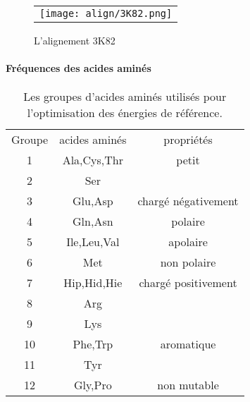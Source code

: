     \clearpage

   \begin{figure}[t]
     \centering
     \begin{tabular}{c}
       \texttt{[image: align/3K82.png]} \\
     \end{tabular}
     \caption{L'alignement 3K82 }
\label{graph:convEref}
   \end{figure}

    \clearpage




\paragraph{Fréquences des acides aminés}


    \begin{table}[!htbp]
      \centering

      \begin{tabular}{ccc}

        \toprule
        Groupe & acides aminés & propriétés\\
        \cmidrule{1-3}

        1   & Ala,Cys,Thr & petit\\
        2   & Ser &\\
        \cmidrule{1-3}
        3   & Glu,Asp & chargé négativement\\
        \cmidrule{1-3}
        4   & Gln,Asn & polaire\\
        \cmidrule{1-3}
        5   & Ile,Leu,Val & apolaire\\
        \cmidrule{1-3}
        6   & Met & non polaire\\
        \cmidrule{1-3}
        7   & Hip,Hid,Hie & chargé positivement\\
        8   & Arg \\
        9   & Lys \\
        \cmidrule{1-3}
        10  & Phe,Trp & aromatique\\
        11  & Tyr \\
        \cmidrule{1-3}
        12  & Gly,Pro & non mutable\\
        \bottomrule


      \end{tabular}      
      \caption{Les groupes d'acides aminés utilisés pour l'optimisation des énergies de référence.}
\label{tab:AA_groupes}      
    \end{table}



